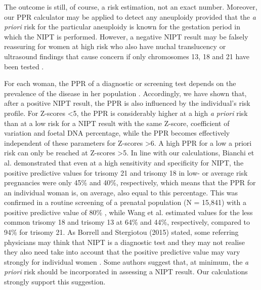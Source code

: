 The outcome is still, of course, a risk estimation, not an exact number. Moreover, our PPR calculator may be applied to detect any aneuploidy provided that the \textsl{a priori} risk for the particular aneuploidy is known for the gestation period in which the NIPT is performed. 
However, a negative NIPT result may be falsely reassuring for women at high risk who also have nuchal translucency or ultrasound findings that cause concern if only chromosomes 13, 18 and 21 have been tested \cite{Smith_2014}.

For each woman, the PPR of a diagnostic or screening test depends on the prevalence of the disease in her population \cite{Lalkhen_2008}. 
Accordingly, we have shown that, after a positive NIPT result, the PPR is also influenced by the individual’s risk profile. 
For Z-scores \textless 5, the PPR is considerably higher at a high \textsl{a priori} risk than at a low risk for a NIPT result with the same Z-score, coefficient of variation and foetal DNA percentage, while the PPR becomes effectively independent of these parameters for Z-scores \textgreater 6. 
A high PPR for a low a priori risk can only be reached at Z-scores \textgreater 5. 
In line with our calculations, Bianchi et al. \cite{Bianchi_2014} demonstrated that even at a high sensitivity and specificity for NIPT, the positive predictive values for trisomy 21 and trisomy 18 in low- or average risk pregnancies were only 45\% and 40\%, respectively, which means that the PPR for an individual woman is, on average, also equal to this percentage. 
This was confirmed in a routine screening of a prenatal population (N = 15,841) with a positive predictive value of 80\% \cite{Norton_2015}, while Wang et al. \cite{Wang_2014b} estimated values for the less common trisomy 18 and trisomy 13 at 64\% and 44\%, respectively, compared to 94\% for trisomy 21. 
As Borrell and Stergiotou (2015) stated, some referring physicians may think that NIPT is a diagnostic test and they may not realise they also need take into account that the positive predictive value may vary strongly for individual women \cite{Borrell_2015}. 
Some authors \cite{Morain_2013,Sparks_2012a} suggest that, at minimum, the \textsl{a priori} risk should be incorporated in assessing a NIPT result. 
Our calculations strongly support this suggestion.

